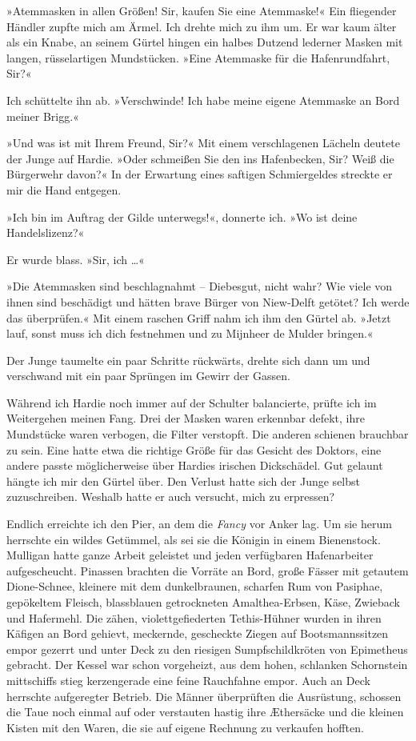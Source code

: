 »Atemmasken in allen Größen! Sir, kaufen Sie eine Atemmaske!« Ein
fliegender Händler zupfte mich am Ärmel. Ich drehte mich zu ihm um.
Er war kaum älter als ein Knabe, an seinem Gürtel hingen ein halbes
Dutzend lederner Masken mit langen, rüsselartigen Mundstücken.
»Eine Atemmaske für die Hafenrundfahrt, Sir?«

Ich schüttelte ihn ab. »Verschwinde! Ich habe meine eigene
Atemmaske an Bord meiner Brigg.«

»Und was ist mit Ihrem Freund, Sir?« Mit einem verschlagenen
Lächeln deutete der Junge auf Hardie. »Oder schmeißen Sie den ins
Hafenbecken, Sir? Weiß die Bürgerwehr davon?« In der Erwartung
eines saftigen Schmiergeldes streckte er mir die Hand entgegen.

»Ich bin im Auftrag der Gilde unterwegs!«, donnerte ich. »Wo ist
deine Handelslizenz?«

Er wurde blass. »Sir, ich \ldots{}«

»Die Atemmasken sind beschlagnahmt – Diebesgut, nicht wahr? Wie
viele von ihnen sind beschädigt und hätten brave Bürger von
Niew-Delft getötet? Ich werde das überprüfen.« Mit einem raschen
Griff nahm ich ihm den Gürtel ab. »Jetzt lauf, sonst muss ich dich
festnehmen und zu Mijnheer de Mulder bringen.«

Der Junge taumelte ein paar Schritte rückwärts, drehte sich dann um
und verschwand mit ein paar Sprüngen im Gewirr der Gassen.

Während ich Hardie noch immer auf der Schulter balancierte, prüfte
ich im Weitergehen meinen Fang. Drei der Masken waren erkennbar
defekt, ihre Mundstücke waren verbogen, die Filter verstopft. Die
anderen schienen brauchbar zu sein. Eine hatte etwa die richtige
Größe für das Gesicht des Doktors, eine andere passte
möglicherweise über Hardies irischen Dickschädel. Gut gelaunt
hängte ich mir den Gürtel über. Den Verlust hatte sich der Junge
selbst zuzuschreiben. Weshalb hatte er auch versucht, mich zu
erpressen?

\bigpar

Endlich erreichte ich den Pier, an dem die \emph{Fancy} vor Anker
lag. Um sie herum herrschte ein wildes Getümmel, als sei sie die
Königin in einem Bienenstock. Mulligan hatte ganze Arbeit geleistet
und jeden verfügbaren Hafenarbeiter aufgescheucht. Pinassen
brachten die Vorräte an Bord, große Fässer mit getautem
Dione-Schnee, kleinere mit dem dunkelbraunen, scharfen Rum von
Pasiphae, gepökeltem Fleisch, blassblauen getrockneten
Amalthea-Erbsen, Käse, Zwieback und Hafermehl. Die zähen,
violettgefiederten Tethis-Hühner wurden in ihren Käfigen an Bord
gehievt, meckernde, gescheckte Ziegen auf Bootsmannssitzen empor
gezerrt und unter Deck zu den riesigen Sumpfschildkröten von
Epimetheus gebracht. Der Kessel war schon vorgeheizt, aus dem
hohen, schlanken Schornstein mittschiffs stieg kerzengerade eine
feine Rauchfahne empor. Auch an Deck herrschte aufgeregter Betrieb.
Die Männer überprüften die Ausrüstung, schossen die Taue noch
einmal auf oder verstauten hastig ihre Æthersäcke und die kleinen
Kisten mit den Waren, die sie auf eigene Rechnung zu verkaufen
hofften.

